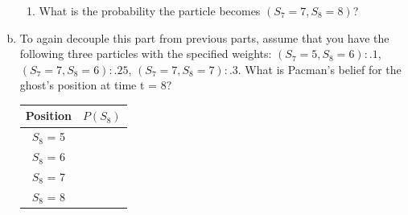 \documentclass[a4paper]{article}
\newif\ifsol
\begin{document}
\begin{enumerate}[a)]
\begin{enumerate}
            \item What is the probability the particle becomes $(S_7 = 7, S_8 = 8)$?\\
            \ifsol {\color{blue} 0.5. This is just $P(S_8 = 8|S_6 = 6, S_7 = 7) = F(D_1 = 1, D_2 = 2) = 0.5.$} \\
            \else \bigskip \bigskip
            \fi
        \end{enumerate}
        
        \item To again decouple this part from previous parts, assume that you have the following three particles with the specified weights: $(S_7 = 5, S_8 = 6): .1$, $(S_7 = 7, S_8 = 6): .25$, $(S_7 = 7, S_8 = 7): .3$. What is Pacman’s belief for the ghost’s position at time t = 8?\\
        \begin{tabular}{|c|c}
            \hline
            Position  & $P(S_8)$\\
            \hline
            $S_8$ = 5 & \ifsol {\color{blue}$\frac{0}{.1+.25+.3} = 0$} \else \quad \quad  \quad \quad \quad \quad \quad \quad \fi \\[15pt]
            \hline
            $S_8$ = 6 & \ifsol {\color{blue}$\frac{.1+.25}{.1+.25+.3} = \frac{.35}{.65} = \frac{7}{13}$} \else \quad \quad \quad \quad \quad \quad \quad \quad \fi \\[15pt]
            \hline
            $S_8$ = 7 & \ifsol {\color{blue}$\frac{.3}{.1+.25+.3} = \frac{.3}{.65} = \frac{6}{13}$} \else \quad \quad \quad \quad \quad \quad \quad \quad  \fi \\[15pt]
            \hline
            $S_8$ = 8 & \ifsol {\color{blue}$\frac{0}{.1+.25+.3} = 0$} \else \quad \quad \quad \quad \quad \quad \quad \quad \fi \\[15pt]
            \hline
        \end{tabular}
        
    \end{enumerate}
    
\end{document}
